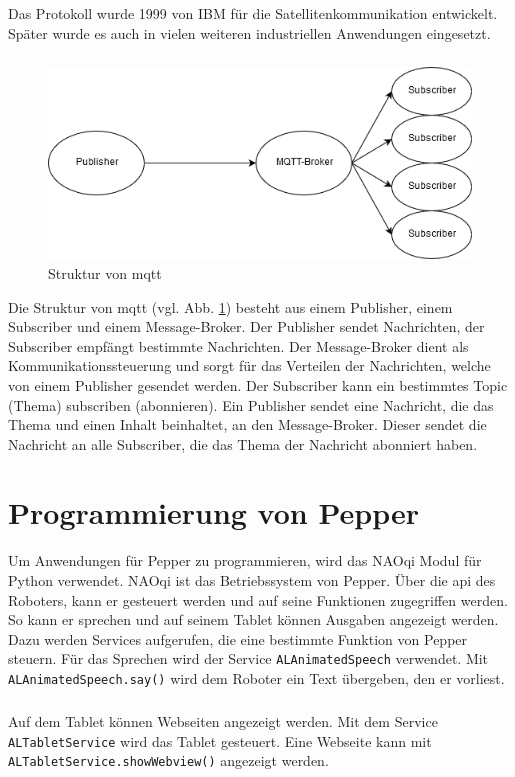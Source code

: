 \subparagraph{}
Das Protokoll wurde 1999 von IBM für die
Satellitenkommunikation entwickelt. Später wurde es auch in vielen weiteren
industriellen Anwendungen eingesetzt.

\subparagraph{}
\begin{figure}
  \centering
     \includegraphics[width=\textwidth]{mqtt-struktur}
  \caption{Struktur von \ac{mqtt}}
  \label{fig:mqtt}
\end{figure}

Die Struktur von \ac{mqtt} (vgl. Abb. \ref{fig:mqtt}) besteht aus einem Publisher,
einem Subscriber und einem Message-Broker. Der Publisher sendet Nachrichten, der Subscriber
empfängt bestimmte Nachrichten. Der Message-Broker dient als
Kommunikationssteuerung und sorgt für das Verteilen der Nachrichten, welche von
einem Publisher gesendet werden. Der Subscriber kann ein bestimmtes Topic
(Thema) subscriben (abonnieren). Ein Publisher sendet eine Nachricht, die das
Thema und einen Inhalt beinhaltet, an den Message-Broker. Dieser sendet die
Nachricht an alle Subscriber, die das Thema der Nachricht abonniert haben.
\cite{dennisseidel2018}

\section{Programmierung von Pepper}
Um Anwendungen für Pepper zu programmieren, wird das NAOqi Modul für Python
verwendet. NAOqi ist das Betriebssystem %
von Pepper. Über die \ac{api} des Roboters, kann er gesteuert werden und auf
seine Funktionen zugegriffen werden. So kann er sprechen und auf seinem Tablet
können Ausgaben angezeigt werden. Dazu werden Services aufgerufen, die eine
bestimmte Funktion von Pepper steuern. Für das Sprechen wird der Service
\texttt{ALAnimatedSpeech} verwendet. Mit \texttt{ALAnimatedSpeech.say()} wird
dem Roboter ein Text übergeben, den er vorliest.

\subparagraph{}
Auf dem Tablet können Webseiten angezeigt werden. Mit dem Service
\texttt{ALTabletService} wird das Tablet gesteuert. Eine Webseite kann mit
\texttt{ALTabletService.showWebview()} angezeigt werden.
